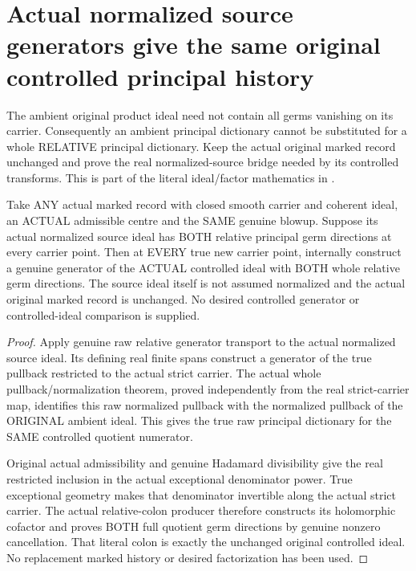 \section{Actual normalized source generators give the same original controlled principal history}

The ambient original product ideal need not contain all germs vanishing
on its carrier. Consequently an ambient principal dictionary cannot be
substituted for a whole RELATIVE principal dictionary. Keep the actual
original marked record unchanged and prove the real normalized-source
bridge needed by its controlled transforms. This is part of the literal
ideal/factor mathematics in \cite[\S12, pp.~293--295]{bierstone-milman97-invent-math}.

\begin{theorem}
\label{hir:sharp-actual-normalized-source-controlled-relative-principal}
\leanok
Take ANY actual marked record with closed smooth carrier and coherent
ideal, an ACTUAL admissible centre and the SAME genuine blowup. Suppose
its actual normalized source ideal has BOTH relative principal germ
directions at every carrier point. Then at EVERY true new carrier point,
internally construct a genuine generator of the ACTUAL controlled ideal
with BOTH whole relative germ directions. The source ideal itself is
not assumed normalized and the actual original marked record is unchanged.
No desired controlled generator or controlled-ideal comparison is supplied.
\end{theorem}
\begin{proof}
Apply genuine raw relative generator transport to the actual normalized
source ideal. Its defining real finite spans construct a generator of
the true pullback restricted to the actual strict carrier. The actual
whole pullback/normalization theorem, proved independently from the real
strict-carrier map, identifies this raw normalized pullback with the
normalized pullback of the ORIGINAL ambient ideal. This gives the true
raw principal dictionary for the SAME controlled quotient numerator.

Original actual admissibility and genuine Hadamard divisibility give
the real restricted inclusion in the actual exceptional denominator
power. True exceptional geometry makes that denominator invertible along
the actual strict carrier. The actual relative-colon producer therefore
constructs its holomorphic cofactor and proves BOTH full quotient germ
directions by genuine nonzero cancellation. That literal colon is exactly
the unchanged original controlled ideal. No replacement marked history
or desired factorization has been used.
\end{proof}

